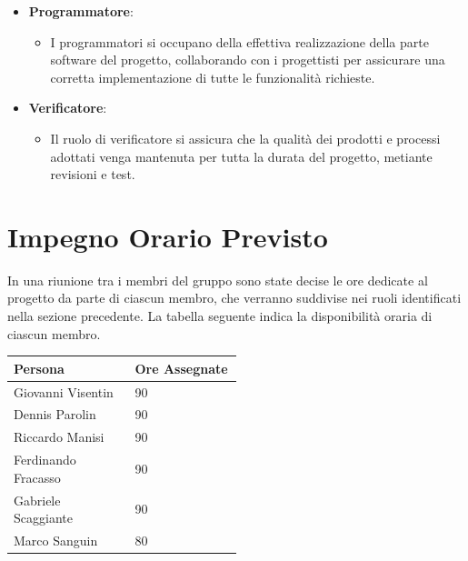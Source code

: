\documentclass[a4paper,12pt]{article}
\begin{document}
\begin{itemize}
    \item \textbf{Programmatore}:
        \begin{itemize}
            \item I programmatori si occupano della effettiva realizzazione della parte software del progetto, collaborando con i progettisti per assicurare una corretta implementazione di tutte le funzionalità richieste.
        \end{itemize}

    \item \textbf{Verificatore}:
        \begin{itemize}
            \item Il ruolo di verificatore si assicura che la qualità dei prodotti e processi adottati venga mantenuta per tutta la durata del progetto, metiante revisioni e test.
        \end{itemize}
\end{itemize}

\section{Impegno Orario Previsto}
In una riunione tra i membri del gruppo sono state decise le ore dedicate al progetto da parte di ciascun membro, che verranno suddivise nei ruoli identificati nella sezione precedente.
La tabella seguente indica la disponibilità oraria di ciascun membro.
\begin{center}
    \small
    \renewcommand{\arraystretch}{1.2} 
    \begin{tabular}{|p{0.30\linewidth}|p{0.20\linewidth}|}
        \hline
        \rowcolor{gray!60} 
        \textbf{Persona} & \textbf{Ore Assegnate}\\
        \hline
        \rowcolor{white}
        Giovanni Visentin & 90 \\
        \hline
        \rowcolor{gray!20}
        Dennis Parolin & 90 \\
        \hline
        \rowcolor{white}
        Riccardo Manisi	& 90 \\
        \hline
        \rowcolor{gray!20}
        Ferdinando Fracasso & 90 \\
        \hline
        \rowcolor{white}
        Gabriele Scaggiante & 90 \\
        \hline
        \rowcolor{gray!20}
        Marco Sanguin & 80 \\
        \hline
    \end{tabular}
\end{center}
    
\end{document}
